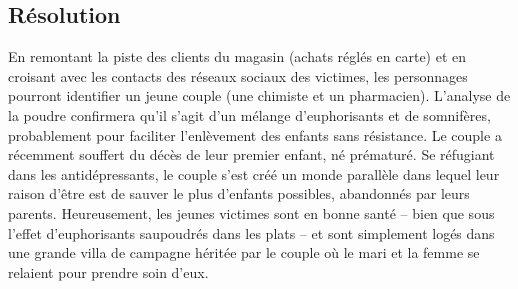 \subsection{Résolution}

En remontant la piste des clients du magasin (achats réglés en carte) et en croisant avec les contacts des réseaux sociaux des victimes, les personnages pourront identifier un jeune couple (une chimiste et un pharmacien).
L'analyse de la poudre confirmera qu'il s'agit d'un mélange d'euphorisants et de somnifères, probablement pour faciliter l'enlèvement des enfants sans résistance.
Le couple a récemment souffert du décès de leur premier enfant, né prématuré.
Se réfugiant dans les antidépressants, le couple s'est créé un monde parallèle dans lequel leur raison d'être est de sauver le plus d'enfants possibles, \og abandonnés \fg par leurs parents.
Heureusement, les jeunes victimes sont en bonne santé -- bien que sous l'effet d'euphorisants saupoudrés dans les plats -- et sont simplement logés dans une grande villa de campagne héritée par le couple où le mari et la femme se relaient pour prendre soin d'eux.
